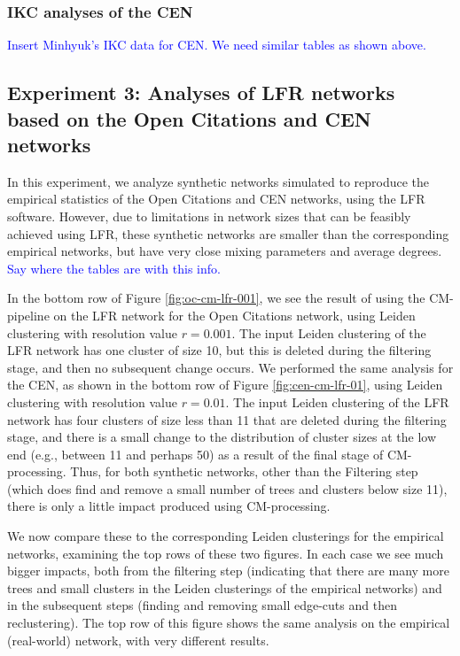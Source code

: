 \documentclass[11pt]{article}   	%
\begin{document}
\clearpage


\subsubsection{IKC analyses of the CEN}

\textcolor{blue}{Insert Minhyuk's IKC data for CEN. We need similar tables as shown above. }


\subsection{Experiment 3: Analyses of LFR networks based on the Open Citations and CEN networks}

In this experiment, we analyze synthetic networks simulated to reproduce the empirical statistics of the Open Citations and CEN networks, using the 
LFR software. 
However, due to limitations in network sizes that can be feasibly achieved using LFR, these synthetic networks are smaller than the corresponding
empirical networks, but have very close mixing parameters and average degrees. 
\textcolor{blue}{Say where the tables are with this info.}

In the bottom row of Figure \ref{fig:oc-cm-lfr-001}, we see the result of using the CM-pipeline on the LFR network for the Open Citations network, using Leiden clustering with
resolution value $r=0.001$.
The input Leiden clustering of the LFR network has one cluster of size 10, but this is deleted during the filtering stage, and then no subsequent change occurs.
We performed the same analysis for the CEN, as shown in  the bottom row of Figure \ref{fig:cen-cm-lfr-01}, using   Leiden clustering with
resolution value $r=0.01$.
The input Leiden clustering of the LFR network has four clusters of size less than 11 that are  deleted during the filtering stage, and there is a small change to the distribution of cluster sizes at the low end (e.g., between 11 and perhaps 50) as a result of the final stage of CM-processing.
Thus, for both synthetic networks, other than the Filtering step (which does find and remove a small number of trees and clusters below size 11), there is only a little
impact produced using CM-processing. 

We now compare these to the corresponding Leiden clusterings for the empirical networks, examining the top rows of these two figures. 
In each case we see much bigger impacts, both from the filtering step (indicating that there are many more  trees and small clusters in the Leiden clusterings of the empirical 
networks) and in the subsequent steps (finding and removing small edge-cuts and then reclustering). 
The top row of this figure shows the same analysis on the empirical (real-world)  network, with very different results.
\end{document}
